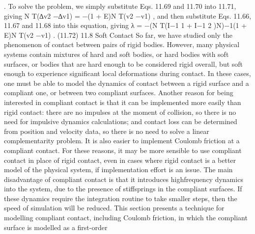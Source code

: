 . To solve the problem, we simply substitute Eqs. 11.69 and 11.70 into 11.71, giving N T(∆v2 −∆v1) = −(1 + E)N T(v2 −v1) , and then substitute Eqs. 11.66, 11.67 and 11.68 into this equation, giving λ = −(N T(I−1 1 + I−1 2 )N)−1(1 + E)N T(v2 −v1) . (11.72) 11.8 Soft Contact So far, we have studied only the phenomenon of contact between pairs of rigid bodies. However, many physical systems contain mixtures of hard and soft bodies, or hard bodies with soft surfaces, or bodies that are hard enough to be considered rigid overall, but soft enough to experience significant local deformations during contact. In these cases, one must be able to model the dynamics of contact between a rigid surface and a compliant one, or between two compliant surfaces. Another reason for being interested in compliant contact is that it can be implemented more easily than rigid contact: there are no impulses at the moment of collision, so there is no need for impulsive dynamics calculations; and contact loss can be determined from position and velocity data, so there is no need to solve a linear complementarity problem. It is also easier to implement Coulomb friction at a compliant contact. For these reasons, it may be more sensible to use compliant contact in place of rigid contact, even in cases where rigid contact is a better model of the physical system, if implementation effort is an issue. The main disadvantage of compliant contact is that it introduces highfrequency dynamics into the system, due to the presence of stiffsprings in the compliant surfaces. If these dynamics require the integration routine to take smaller steps, then the speed of simulation will be reduced. This section presents a technique for modelling compliant contact, including Coulomb friction, in which the compliant surface is modelled as a first-order

